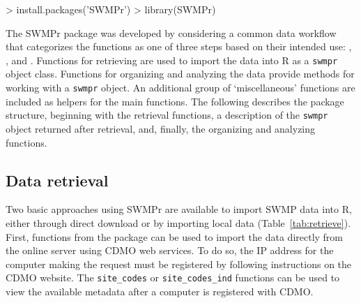 \begin{example}
> install.packages('SWMPr')
> library(SWMPr)
\end{example}


The SWMPr package was developed by considering a common data workflow that categorizes the functions as one of three steps based on their intended use: , , and .  Functions for retrieving are used to import the data into R as a \texttt{swmpr} object class.  Functions for organizing and analyzing the data provide methods for working with a \texttt{swmpr} object.  An additional group of `miscellaneous' functions are included as helpers for the main functions.  The following describes the package structure, beginning with the retrieval functions, a description of the \texttt{swmpr} object returned after retrieval, and, finally, the organizing and analyzing functions.

\subsection{Data retrieval}

Two basic approaches using SWMPr are available to import SWMP data into R, either through direct download or by importing local data (Table~\ref{tab:retrieve}). First, functions from the package can be used to import the data directly from the online server using CDMO web services. To do so, the IP address for the computer making the request must be registered by following instructions on the CDMO website.  The \texttt{site\_codes} or \texttt{site\_codes\_ind} functions can be used to view the available metadata after a computer is registered with CDMO. 

